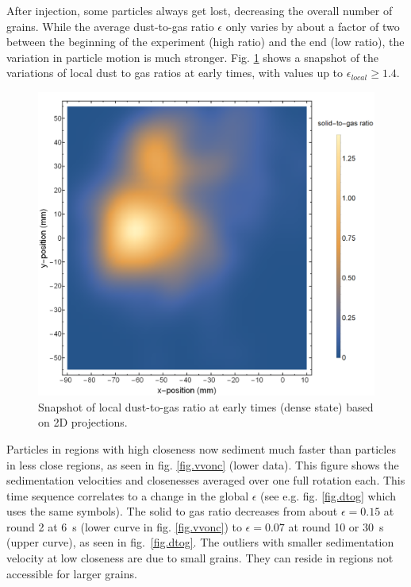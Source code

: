 After injection, some particles always get lost, decreasing the overall number of grains.
While the average dust-to-gas ratio $\epsilon$ only varies by about a factor of two between the beginning of the experiment (high ratio) and the end (low ratio), 
the variation in particle motion is much stronger.
Fig. \ref{fig.dtog2} shows a snapshot of the variations of local dust to gas ratios at early times, with values up to $\epsilon_{local} \geq 1.4$.
\begin{figure}[h]
\includegraphics[width=\columnwidth]{density.pdf}
    \caption{\label{fig.dtog2}Snapshot of local dust-to-gas ratio at early times (dense state) based on 2D projections. 
}
\end{figure}
Particles in regions with high closeness now sediment 
much 
faster than particles in less
close regions, as seen in fig. \ref{fig.vvonc} (lower data). This figure shows the sedimentation velocities and closenesses averaged over one full rotation each.  This time sequence correlates to a change in the global $\epsilon$ (see e.g. fig. \ref{fig.dtog} which uses the same symbols). 
The solid to gas ratio decreases from about $\epsilon = 0.15$ at round 2 at 6~s 
(lower curve in fig. \ref{fig.vvonc}) to $\epsilon = 0.07$ at round 10 or 30~s (upper curve), as seen in fig.~\ref{fig.dtog}.
{The outliers with smaller sedimentation velocity at low closeness are due to small grains. They can reside in regions not accessible for larger grains.}


